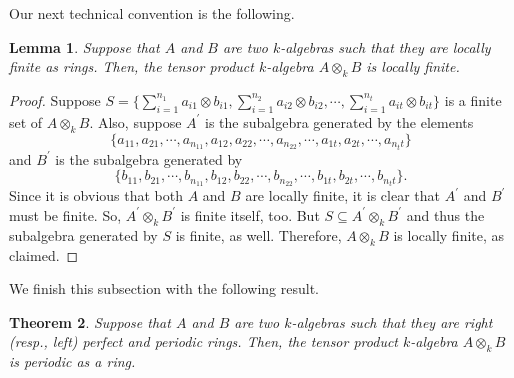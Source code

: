 \documentclass[12pt]{amsart}
\newtheorem{thm}{Theorem}[section]
\newtheorem{lem}[thm]{Lemma}
\theoremstyle{definition}
\theoremstyle{remark}
\numberwithin{equation}{section}
\begin{document}
Our next technical convention is the following.

\begin{lem}\label{lemma5.3}
Suppose that $A$ and $B$ are two $k$-algebras such that they are locally finite as rings. Then, the tensor product $k$-algebra $A \otimes_k B$ is locally finite.
\end{lem}

\begin{proof}
Suppose $S=\{ \sum_{i=1}^{n_1} a_{i1} \otimes b_{i1}, \sum_{i=1}^{n_2} a_{i2} \otimes b_{i2}, \cdots, \sum_{i=1}^{n_t} a_{it} \otimes b_{it} \}$ is a finite set of $A \otimes_k B$. Also, suppose $A^{'}$ is the subalgebra generated by the elements $$\{a_{11},a_{21}, \cdots , a_{n_11},a_{12},a_{22}, \cdots,a_{n_22}, \cdots,a_{1t},a_{2t}, \cdots,a_{n_tt}\}$$
and $B^{'}$ is the subalgebra generated by $$\{b_{11},b_{21}, \cdots , b_{n_11},b_{12},b_{22}, \cdots,b_{n_22}, \cdots,b_{1t},b_{2t}, \cdots,b_{n_tt}\}.$$
Since it is obvious that both $A$ and $B$ are locally finite, it is clear that $A^{'}$ and $B^{'}$ must be finite. So, $A^{'} \otimes_k B^{'}$ is finite itself, too. But $S \subseteq A^{'} \otimes_k B^{'}$ and thus the subalgebra generated by $S$ is finite, as well. Therefore, $A \otimes_k B$ is locally finite, as claimed.
\end{proof}

We finish this subsection with the following result.

\begin{thm}\label{theorem5.4}
Suppose that $A$ and $B$ are two $k$-algebras such that they are right (resp., left) perfect and periodic rings. Then, the tensor product $k$-algebra $A \otimes_k B$ is periodic as a ring.
\end{thm}
\end{document}
